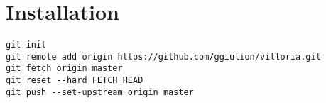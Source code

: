 \documentclass{article}
\begin{document}
\section{Installation}

\begin{verbatim}
git init
git remote add origin https://github.com/ggiulion/vittoria.git
git fetch origin master
git reset --hard FETCH_HEAD
git push --set-upstream origin master
\end{verbatim}
\end{document}

